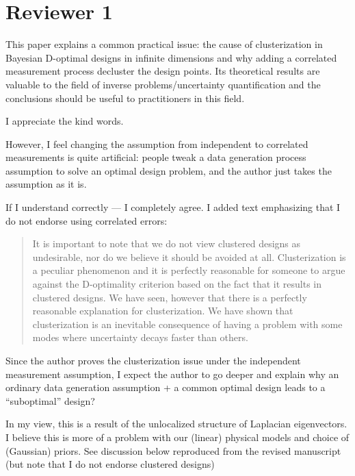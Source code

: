 \section{Reviewer 1}
\RC This paper explains a common practical issue: the cause of
clusterization in Bayesian D-optimal designs in infinite dimensions
and why adding a correlated measurement process decluster the design
points. Its theoretical results are valuable to the field of inverse
problems/uncertainty quantification and the conclusions should be
useful to practitioners in this field.

\AR I appreciate the kind words.


\RC However, I feel changing the assumption from independent to correlated
measurements is quite artificial: people tweak a data generation
process assumption to solve an optimal design problem, and the author
just takes the assumption as it is.

\AR If I understand correctly --- I completely agree. I added text
emphasizing that I do not endorse using correlated errors:


\begin{quote}
  It is important to note that we do not view clustered designs as
  undesirable, nor do we believe it should be avoided at
  all. Clusterization is a peculiar phenomenon and it is perfectly
  reasonable for someone to argue against the D-optimality criterion
  based on the fact that it results in clustered designs. We have
  seen, however that there is a perfectly reasonable explanation for
  clusterization. We have shown that clusterization is an inevitable
  consequence of having a problem with some modes where uncertainty
  decays faster than others.
\end{quote}

\RC Since the author proves the clusterization issue under the independent
measurement assumption, I expect the author to go deeper and explain
why an ordinary data generation assumption + a common optimal design
leads to a “suboptimal” design?

\AR In my view, this is a result of the unlocalized structure of
Laplacian eigenvectors. I believe this is more of a problem with our
(linear) physical models and choice of (Gaussian) priors. See
discussion below reproduced from the revised manuscript (but note that
I do not endorse clustered designs)


